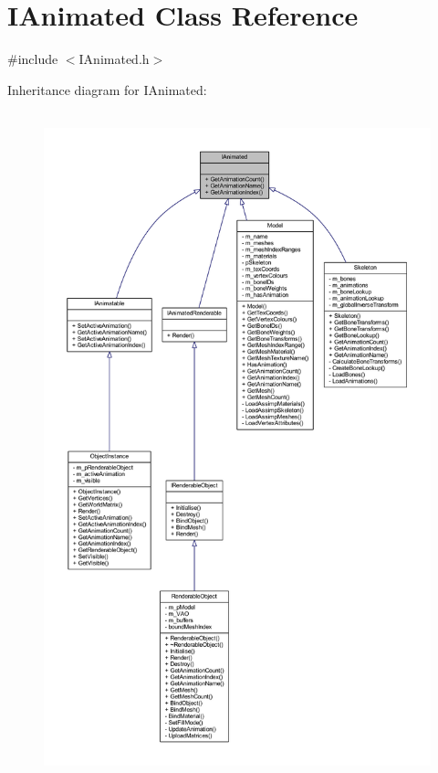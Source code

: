 \hypertarget{class_i_animated}{}\section{I\+Animated Class Reference}
\label{class_i_animated}


{\ttfamily \#include $<$I\+Animated.\+h$>$}



Inheritance diagram for I\+Animated\+:
\nopagebreak
\begin{figure}[H]
\begin{center}
\leavevmode
\includegraphics[height=550pt]{class_i_animated__inherit__graph}
\end{center}
\end{figure}


